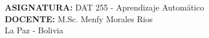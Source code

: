 \begin{titlepage}
    \vfill
    
    {\fontsize{11}{14}\selectfont \textbf{ASIGNATURA:} DAT 255 - Aprendizaje Automático}\\[0.2cm]
    {\fontsize{11}{14}\selectfont \textbf{DOCENTE:} M.Sc. Menfy Morales Rios}\\[0.25cm]
    {\fontsize{11}{14}\selectfont La Paz - Bolivia}
    
    \vspace*{0.2cm}
\end{titlepage}
